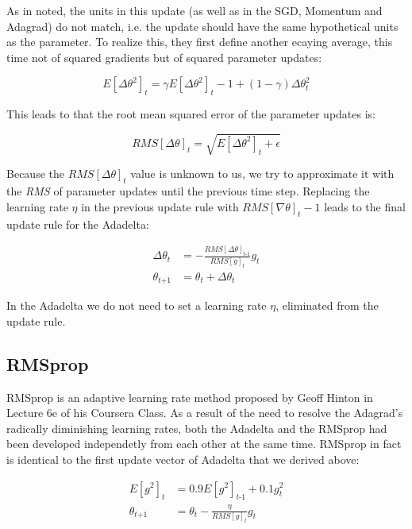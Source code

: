 \documentclass[12pt,oneside,a4paper,parskip]{scrbook}
\begin{document}
As in \cite{AdadeltaAddition} noted, the units in this update (as well as in the SGD, Momentum and Adagrad) do not match,
i.e. the update should have the same hypothetical units as the parameter. To realize this, they first define another 
ecaying average, this time not of squared gradients but of squared parameter updates:

\begin{equation}
  \textit{E}[\Delta\theta^2]_t = \gamma\textit{E}[\Delta\theta^2]_t-1 + (1-\gamma)\Delta\theta^2_t
\end{equation}

This leads to that the root mean squared error of the parameter updates is:

\begin{equation}
  \textit{RMS}[\Delta\theta]_t = \sqrt{\textit{E}[\Delta\theta^2]_t + \epsilon}
\end{equation}

Because the $\textit{RMS}[\Delta\theta]_t$ value is unknown to us, we try to approximate it with the \textit{RMS} of 
parameter updates until the previous time step. Replacing the learning rate $\eta$ in the previous update rule with $\textit{RMS}[\nabla\theta]_t-1$
leads to the final update rule for the Adadelta:

\begin{equation}
  \begin{split}
  \Delta\theta_t &= - \frac{\textit{RMS}[\Delta\theta]_\textit{t-1}}{RMS[\textit{g}]_t} \textit{g}_\textit{t} \\
  \theta_\textit{t+1} &= \theta_t + \Delta\theta_t
  \end{split}
\end{equation}

In the Adadelta we do not need to set a learning rate $\eta$, eliminated from the update rule. \cite{overvieDiffRSLVQ}

\subsection{RMSprop}
RMSprop is an adaptive learning rate method proposed by Geoff Hinton in Lecture 6e of his Coursera Class. \cite{RMSprop_Hinton}
As a result of the need to resolve the Adagrad's radically diminishing learning rates, both the Adadelta and 
the RMSprop had been developed independetly from each other at the same time. RMSprop in fact is identical
to the first update vector of Adadelta that we derived above:

\begin{equation}
  \begin{split}
  \textit{E}[\textit{g}^2]_t &= 0.9\textit{E}[\textit{g}^2]_\textit{t-1} + 0.1\textit{g}^2_t \\
  \theta_\textit{t+1} &= \theta_\textit{t}-\frac{\eta}{RMS[\textit{g}]_t} \textit{g}_\textit{t}
  \end{split}
\end{equation}
\end{document}
